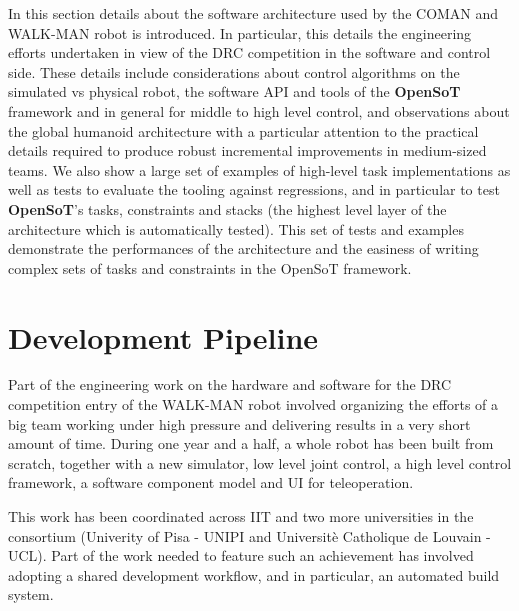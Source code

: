 

In this section details about the software architecture used by the COMAN and WALK-MAN robot is introduced. In particular, this details the engineering efforts undertaken in view of the DRC competition in the software and control side. 
These details include considerations about control algorithms on the simulated vs physical robot, the software API and tools of the \textbf{OpenSoT} framework and in general for middle to high level control, and observations about the global humanoid architecture with a particular attention to the practical details required to produce robust incremental improvements in medium-sized teams. We also show a large set of examples of high-level task implementations as well as tests to evaluate the tooling against regressions, and in particular to test \textbf{OpenSoT}'s tasks, constraints and stacks (the highest level layer of the architecture which is automatically tested).
This set of tests and examples demonstrate the performances of the architecture and the easiness of writing complex sets of tasks and constraints in the OpenSoT framework.

\section{Development Pipeline}
Part of the engineering work on the hardware and software for the DRC competition entry of the WALK-MAN robot involved organizing the efforts of a big team working under high pressure and delivering results in a very short amount of time.
During one year and a half, a whole robot has been built from scratch, together with a new simulator, low level joint control, a high level control framework, a software component model and UI for teleoperation.

This work has been coordinated across IIT and two more universities in the consortium (Univerity of Pisa - UNIPI and Universit\`e Catholique de Louvain - UCL). Part of the work needed to feature such an achievement has involved adopting a shared development workflow, and in particular, an automated build system.

